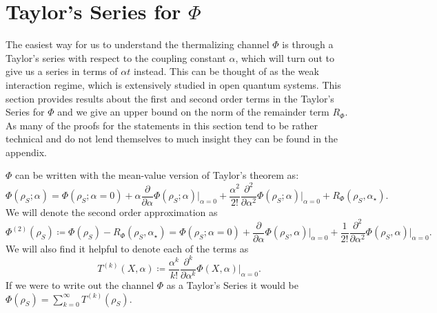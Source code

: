 \documentclass{article}
\begin{document}
\section{Taylor's Series for $\Phi$} \label{sec:taylor_series_phi}

The easiest way for us to understand the thermalizing channel $\Phi$ is through a Taylor's series with respect to the coupling constant $\alpha$, which will turn out to give us a series in terms of $\alpha t$ instead. This can be thought of as the weak interaction regime, which is extensively studied in open quantum systems. This section provides results about the first and second order terms in the Taylor's Series for $\Phi$ and we give an upper bound on the norm of the remainder term $R_{\Phi}$. As many of the proofs for the statements in this section tend to be rather technical and do not lend themselves to much insight they can be found in the appendix. 

$\Phi$ can be written with the mean-value version of Taylor's theorem as:
\begin{equation}
    \Phi(\rho_S; \alpha) = \Phi(\rho_S; \alpha = 0) + \alpha \frac{\partial}{\partial \alpha} \Phi(\rho_S; \alpha) \bigg|_{\alpha = 0} + \frac{\alpha^2}{2!} \frac{\partial^2}{\partial \alpha^2} \Phi(\rho_S; \alpha) \bigg|_{\alpha = 0} + R_{\Phi}(\rho_S, \alpha_{\star}).
\end{equation}
We will denote the second order approximation as
\begin{equation}
    \Phi^{(2)}(\rho_S) \coloneqq \Phi(\rho_S) - R_{\Phi}(\rho_S, \alpha_\star) = \Phi(\rho_S;\alpha= 0) + \frac{\partial}{\partial \alpha} \Phi(\rho_S, \alpha) \bigg|_{\alpha = 0} + \frac{1}{2!} \frac{\partial^2}{\partial \alpha^2} \Phi(\rho_S, \alpha) \bigg|_{\alpha = 0}. \label{def:second_order_approx}
\end{equation}
We will also find it helpful to denote each of the terms as
\begin{equation}
    T^{(k)}(X, \alpha) \coloneqq \frac{\alpha^k}{k!} \frac{\partial^k}{\partial \alpha^k} \Phi(X, \alpha)\bigg|_{\alpha = 0}.\label{def:taylor_series_terms}
\end{equation}
If we were to write out the channel $\Phi$ as a Taylor's Series it would be $\Phi(\rho_S) = \sum_{k = 0}^{\infty} T^{(k)}(\rho_S)$.
\end{document}
